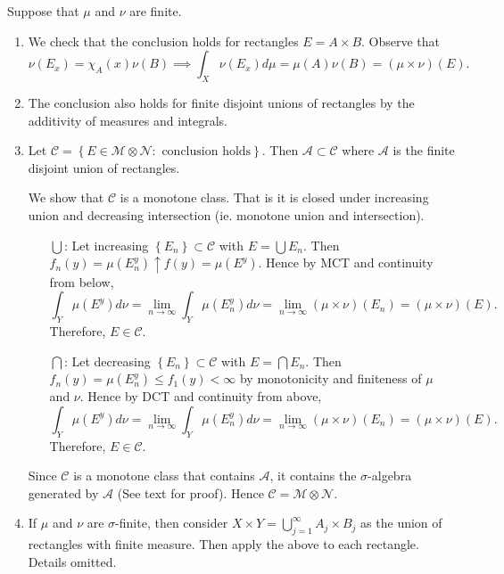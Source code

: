\documentclass[11pt]{article}
\theoremstyle{definition}
\newcommand{\set}[1]{\left\{ #1 \right\}}
\newcommand{\m}[1]{\mathcal{#1}}
\begin{document}
\proof
Suppose that $\mu$ and $\nu$ are finite.
\begin{enumerate}
  \item We check that the conclusion holds for rectangles $E=A\times B$. Observe that
  \[
    \nu(E_x)=\chi_A(x)\nu(B) \implies \int_X\nu(E_x)d\mu=\mu(A)\nu(B)=(\mu\times\nu)(E).
  \]

  \item The conclusion also holds for finite disjoint unions of rectangles by the
  additivity of measures and integrals. 

  \item Let $\m{C}=\set{E\in\m{M}\otimes\m{N}:\text{ conclusion holds}}$. Then
  $\m{A}\subset\m{C}$ where $\m{A}$ is the finite disjoint union of rectangles. 

  We show that $\m{C}$ is a monotone class. That is it is closed under increasing union and
  decreasing intersection (ie. monotone union and intersection). 
  \begin{itemize}
    \item[$\bigcup$:] Let increasing $\set{E_n}\subset\m{C}$ with $E=\bigcup E_n$. Then 
    $f_n(y)=\mu(E_n^y)\uparrow f(y)=\mu(E^y)$. Hence by MCT and continuity from below, 
    \[
      \int_Y\mu(E^y)d\nu = \lim_{n\to\infty}\int_Y\mu(E_n^y)d\nu =
      \lim_{n\to\infty}(\mu\times\nu)(E_n) = (\mu\times\nu)(E) .
    \]
    Therefore, $E\in\m{C}$. 
    \item[$\bigcap$:] Let decreasing $\set{E_n}\subset\m{C}$ with $E=\bigcap E_n$. Then
    $f_n(y)=\mu(E_n^y)\le f_1(y)<\infty$ by monotonicity and finiteness of $\mu$ and $\nu$.
    Hence by DCT and continuity from above, 
    \[
      \int_Y\mu(E^y)d\nu = \lim_{n\to\infty}\int_Y\mu(E_n^y)d\nu =
      \lim_{n\to\infty}(\mu\times\nu)(E_n) = (\mu\times\nu)(E) .
    \]
    Therefore, $E\in\m{C}$. 
  \end{itemize}
  Since $\m{C}$ is a monotone class that contains $\m{A}$, it contains the $\sigma$-algebra
  generated by $\m{A}$ (See text for proof). Hence $\m{C}=\m{M}\otimes\m{N}$.

  \item If $\mu$ and $\nu$ are $\sigma$-finite, then consider $X\times Y =
  \bigcup_{j=1}^\infty A_j\times B_j$ as the union of rectangles with finite measure. Then
  apply the above to each rectangle. Details omitted. 
\end{enumerate}
\qedhere


\end{document}
